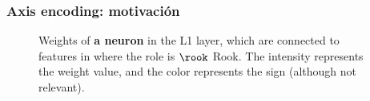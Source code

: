 
\begin{frame}
\frametitle{Axis encoding: motivación}

\begin{figure}[h]
\centering
{}%
\qquad
{}%
\caption{Weights of \textbf{a neuron} in the L1 layer, which are connected to features in  where the role is $\rook$ Rook. The intensity represents the weight value, and the color represents the sign (although not relevant).}
\label{fig:rook_weights}
\end{figure}

\end{frame}
